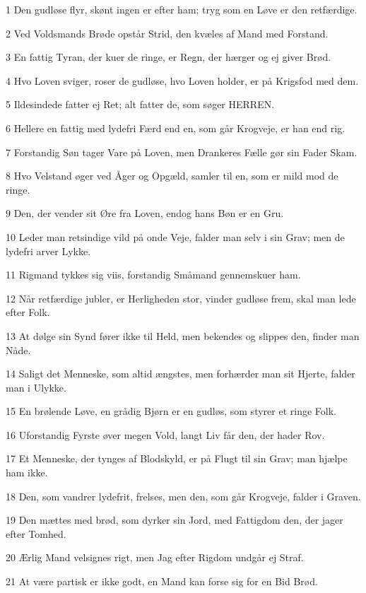 \par 1 Den gudløse flyr, skønt ingen er efter ham; tryg som en Løve er den retfærdige.
\par 2 Ved Voldsmands Brøde opstår Strid, den kvæles af Mand med Forstand.
\par 3 En fattig Tyran, der kuer de ringe, er Regn, der hærger og ej giver Brød.
\par 4 Hvo Loven sviger, roser de gudløse, hvo Loven holder, er på Krigsfod med dem.
\par 5 Ildesindede fatter ej Ret; alt fatter de, som søger HERREN.
\par 6 Hellere en fattig med lydefri Færd end en, som går Krogveje, er han end rig.
\par 7 Forstandig Søn tager Vare på Loven, men Drankeres Fælle gør sin Fader Skam.
\par 8 Hvo Velstand øger ved Åger og Opgæld, samler til en, som er mild mod de ringe.
\par 9 Den, der vender sit Øre fra Loven, endog hans Bøn er en Gru.
\par 10 Leder man retsindige vild på onde Veje, falder man selv i sin Grav; men de lydefri arver Lykke.
\par 11 Rigmand tykkes sig viis, forstandig Småmand gennemskuer ham.
\par 12 Når retfærdige jubler, er Herligheden stor, vinder gudløse frem, skal man lede efter Folk.
\par 13 At dølge sin Synd fører ikke til Held, men bekendes og slippes den, finder man Nåde.
\par 14 Saligt det Menneske, som altid ængstes, men forhærder man sit Hjerte, falder man i Ulykke.
\par 15 En brølende Løve, en grådig Bjørn er en gudløs, som styrer et ringe Folk.
\par 16 Uforstandig Fyrste øver megen Vold, langt Liv får den, der hader Rov.
\par 17 Et Menneske, der tynges af Blodskyld, er på Flugt til sin Grav; man hjælpe ham ikke.
\par 18 Den, som vandrer lydefrit, frelses, men den, som går Krogveje, falder i Graven.
\par 19 Den mættes med brød, som dyrker sin Jord, med Fattigdom den, der jager efter Tomhed.
\par 20 Ærlig Mand velsignes rigt, men Jag efter Rigdom undgår ej Straf.
\par 21 At være partisk er ikke godt, en Mand kan forse sig for en Bid Brød.
